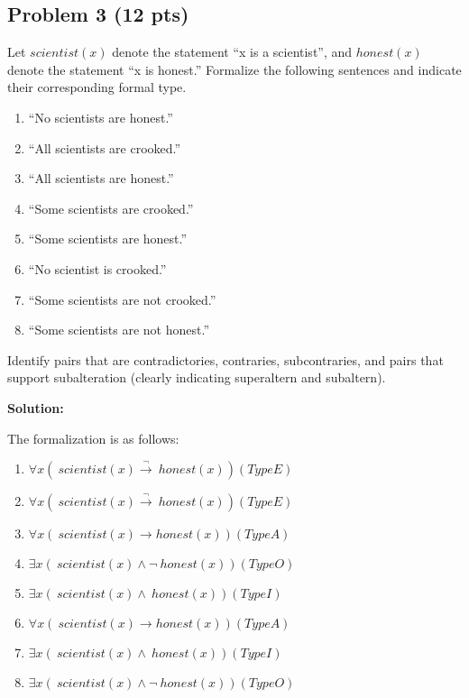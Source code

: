 \documentclass[12pt]{article}
\begin{document}
\newpage

\subsection{Problem 3 (12 pts)}

\noindent Let $scientist(x)$ denote the statement ``x is a scientist'', and $honest(x)$ denote the statement ``x is honest.'' Formalize the following sentences and indicate their corresponding formal type.

\begin{enumerate}
\item ``No scientists are honest.''

\item ``All scientists are crooked.''

\item ``All scientists are honest.''

\item ``Some scientists are crooked.''

\item ``Some scientists are honest.''

\item ``No scientist is crooked.''

\item ``Some scientists are not crooked.''

\item ``Some scientists are not honest.''

\end{enumerate}

\noindent Identify pairs that are contradictories, contraries, subcontraries, and pairs that support subalteration (clearly indicating superaltern and subaltern).

\bigskip
\noindent \textbf{Solution:}

\noindent The formalization is as follows:

\begin{enumerate}
\item $\forall x (~scientist(x) \xrightarrow \neg ~honest(x)) (Type E)$
\item $\forall x (~scientist(x) \xrightarrow \neg ~honest(x)) (Type E)$
\item $\forall x (~scientist(x) \xrightarrow ~honest(x)) (Type A)$
\item $\exists x (~scientist(x) \wedge \neg ~honest(x)) (Type O)$
\item $\exists x (~scientist(x) \wedge ~honest(x)) (Type I)$
\item $\forall x (~scientist(x) \xrightarrow ~honest(x)) (Type A)$
\item $\exists x (~scientist(x) \wedge ~honest(x)) (Type I)$
\item $\exists x (~scientist(x) \wedge \neg ~honest(x)) (Type O)$
\end{enumerate}
\end{document}
